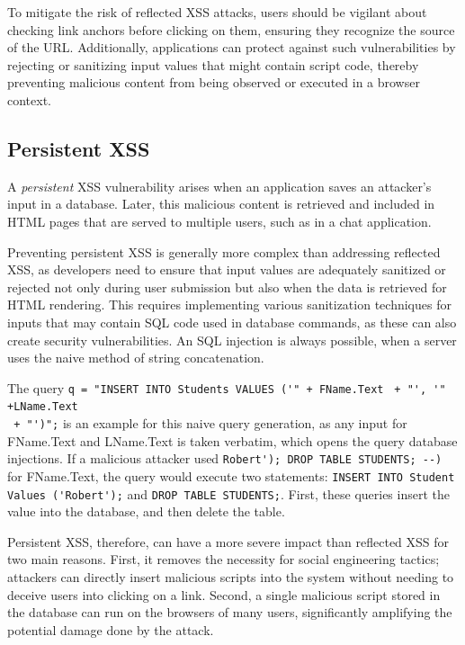 To mitigate the risk of reflected XSS attacks, users should be vigilant about checking link anchors before clicking on them, ensuring they recognize the source of the URL. Additionally, applications can protect against such vulnerabilities by rejecting or sanitizing input values that might contain script code, thereby preventing malicious content from being observed or executed in a browser context.

\subsection{Persistent XSS}
A \textit{persistent} XSS vulnerability arises when an application saves an attacker's input in a database. Later, this malicious content is retrieved and included in HTML pages that are served to multiple users, such as in a chat application.

Preventing persistent XSS is generally more complex than addressing reflected XSS, as developers need to ensure that input values are adequately sanitized or rejected not only during user submission but also when the data is retrieved for HTML rendering. This requires implementing various sanitization techniques for inputs that may contain SQL code used in database commands, as these can also create security vulnerabilities. An SQL injection is always possible, when a server uses the naive method of string concatenation.

The query \lstinline{q = "INSERT INTO Students VALUES ('" + FName.Text } 
\lstinline{+ "', '" +LName.Text} \\\lstinline{ + "')";} is an example for this naive query generation, as any input for FName.Text and LName.Text is taken verbatim, which opens the query database injections. If a malicious attacker used \lstinline{Robert'); DROP TABLE STUDENTS; --) } for FName.Text, the query would execute two statements: \lstinline{INSERT INTO Student Values ('Robert');} and \lstinline{DROP TABLE STUDENTS;}. First, these queries insert the value into the database, and then delete the table. 

Persistent XSS, therefore, can have a more severe impact than reflected XSS for two main reasons. First, it removes the necessity for social engineering tactics; attackers can directly insert malicious scripts into the system without needing to deceive users into clicking on a link. Second, a single malicious script stored in the database can run on the browsers of many users, significantly amplifying the potential damage done by the attack.


